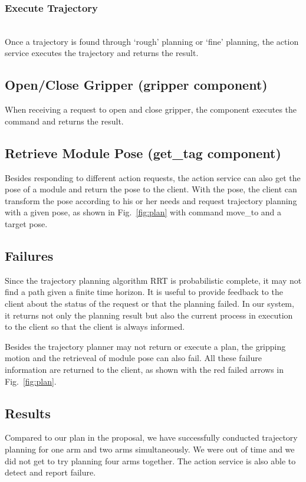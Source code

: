 \subsubsection{Execute Trajectory}~\\
Once a trajectory is found through `rough' planning or `fine' planning, the action service executes the trajectory and returns the result.


\subsection{Open/Close Gripper (gripper component)}
When receiving a request to open and close gripper, the component executes the command and returns the result.

\subsection{Retrieve Module Pose (get\_tag component)}
Besides responding to different action requests, the action service can also get the pose of a module and return the pose to the client. With the pose, the client can transform the pose according to his or her needs and request trajectory planning with a given pose, as shown in Fig.~\ref{fig:plan} with command move\_to and a target pose.


\subsection{Failures}
Since the trajectory planning algorithm RRT is probabilistic complete, it may not find a path given a finite time horizon. It is useful to provide feedback to the client about the status of the request or that the planning failed. In our system, it returns not only the planning result but also the current process in execution to the client so that the client is always informed.

Besides the trajectory planner may not return or execute a plan, the gripping motion and the retrieveal of module pose can also fail. All these failure information are returned to the client, as shown with the red failed arrows in Fig.~\ref{fig:plan}.

\subsection{Results}
Compared to our plan in the proposal, we have successfully conducted trajectory planning for one arm and two arms simultaneously. We were out of time and we did not get to try planning four arms together. The action service is also able to detect and report failure.

